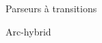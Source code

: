\documentclass[
	hyperref={unicode},
	xcolor={svgnames, table},
	aspectratio=169,
	french,
]{beamer}
\begin{document}
\begin{frame}{Parseurs à transitions}
\begin{overlayarea}{\textwidth}{0.6\textheight}
{\begin{figure}
				\end{figure}
		}
		\vspace{1.5cm}
		\tiny{
		Arc-hybrid \parencite{kuhlmann-etal-2011-dynamic}
		}
	\end{overlayarea}
\end{frame}
\end{document}
